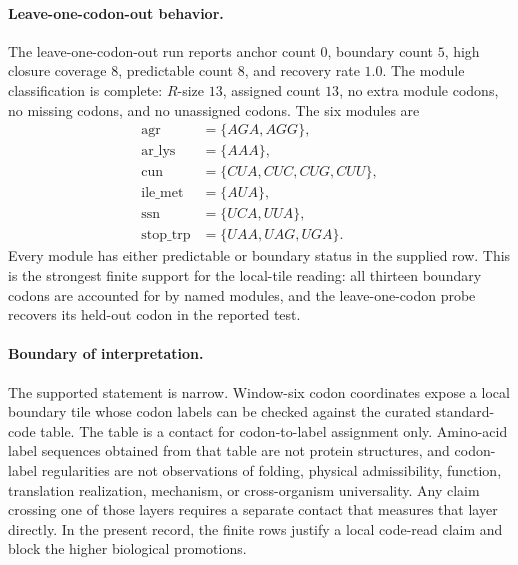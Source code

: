 \paragraph{Leave-one-codon-out behavior.}
The leave-one-codon-out run reports anchor count $0$, boundary count $5$, high closure coverage $8$, predictable count $8$, and recovery rate $1.0$.  The module classification is complete: $R$-size $13$, assigned count $13$, no extra module codons, no missing codons, and no unassigned codons.  The six modules are
$$
\begin{aligned}
\mathrm{agr}&=\{AGA,AGG\},\\
\mathrm{ar\_lys}&=\{AAA\},\\
\mathrm{cun}&=\{CUA,CUC,CUG,CUU\},\\
\mathrm{ile\_met}&=\{AUA\},\\
\mathrm{ssn}&=\{UCA,UUA\},\\
\mathrm{stop\_trp}&=\{UAA,UAG,UGA\}.
\end{aligned}
$$
Every module has either predictable or boundary status in the supplied row.  This is the strongest finite support for the local-tile reading: all thirteen boundary codons are accounted for by named modules, and the leave-one-codon probe recovers its held-out codon in the reported test.

\paragraph{Boundary of interpretation.}
The supported statement is narrow.  Window-six codon coordinates expose a local boundary tile whose codon labels can be checked against the curated standard-code table.  The table is a contact for codon-to-label assignment only.  Amino-acid label sequences obtained from that table are not protein structures, and codon-label regularities are not observations of folding, physical admissibility, function, translation realization, mechanism, or cross-organism universality.  Any claim crossing one of those layers requires a separate contact that measures that layer directly.  In the present record, the finite rows justify a local code-read claim and block the higher biological promotions.

